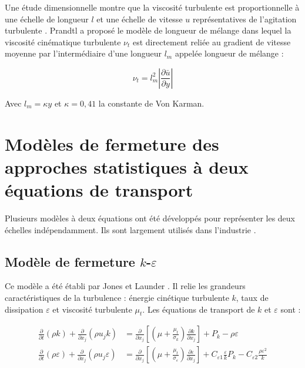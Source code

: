 Une étude dimensionnelle montre que la viscosité turbulente est proportionnelle à une échelle de longueur $l$ et une échelle de vitesse $u$ représentatives de l'agitation turbulente \cite{prandtl1925bericht}. Prandtl a proposé le modèle de longueur de mélange dans lequel la viscosité cinématique turbulente \( \nu_t \) est directement reliée au gradient de vitesse moyenne par l'intermédiaire d'une longueur \( l_m \) appelée longueur de mélange : \cite{prandtl1945uber}

\begin{equation}
\nu_t = l_m^2 \left| \frac{\partial \bar{u}}{\partial y} \right|
\label{eq:longueur_melange}
\end{equation}

Avec \( l_m = \kappa y \) et \( \kappa = 0{,}41 \) la constante de Von Karman.

\section{Modèles de fermeture des approches statistiques à deux équations de transport}
\label{sec:modeles_deux_equations}

Plusieurs modèles à deux équations ont été développés pour représenter les deux échelles indépendamment. Ils sont largement utilisés dans l'industrie \cite{hanjalic2011modelling}.

\subsection{Modèle de fermeture \texorpdfstring{$k$-$\varepsilon$}{k-epsilon}}
\label{subsec:modele_k_epsilon}

Ce modèle a été établi par Jones et Launder \cite{jones1972prediction}. Il relie les grandeurs caractéristiques de la turbulence : énergie cinétique turbulente $k$, taux de dissipation $\varepsilon$ et viscosité turbulente \( \mu_t \). Les équations de transport de $k$ et $\varepsilon$ sont \cite{launder1974application} :

\begin{align}
\frac{\partial}{\partial t} (\rho k) + \frac{\partial}{\partial x_j} (\rho u_j k) &= \frac{\partial}{\partial x_j} \left[ \left( \mu + \frac{\mu_t}{\sigma_k} \right) \frac{\partial k}{\partial x_j} \right] + P_k - \rho \varepsilon \label{eq:transport_k} \\
\frac{\partial}{\partial t} (\rho \varepsilon) + \frac{\partial}{\partial x_j} (\rho u_j \varepsilon) &= \frac{\partial}{\partial x_j} \left[ \left( \mu + \frac{\mu_t}{\sigma_\varepsilon} \right) \frac{\partial \varepsilon}{\partial x_j} \right] + C_{\varepsilon 1} \frac{\varepsilon}{k} P_k - C_{\varepsilon 2} \frac{\rho \varepsilon^2}{k} \label{eq:transport_epsilon}
\end{align}

